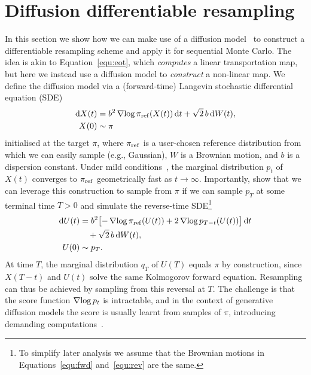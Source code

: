 \documentclass{article}
\begin{document}
\section{Diffusion differentiable resampling}
\label{sec:diffres}
In this section we show how we can make use of a diffusion model~\citep[without training, cf.][]{Baker2025, Wan2025diffpf} to construct a differentiable resampling scheme and apply it for sequential Monte Carlo. 
The idea is akin to Equation~\eqref{equ:eot}, which \emph{computes} a linear transportation map, but here we instead use a diffusion model to \emph{construct} a non-linear map. 
We define the diffusion model via a (forward-time) Langevin stochastic differential equation (SDE)
%
\begin{equation}
    \begin{split}
        \mathop{}\!\mathrm{d} X(t) &= b^2\operatorname{\nabla\!} \log \pi_{\mathrm{ref}}(X(t)) \mathop{}\!\mathrm{d} t + \sqrt{2} \, b \mathop{}\!\mathrm{d} W(t), \\
        X(0) &\sim \pi
    \end{split}
    \label{equ:fwd}
\end{equation}
%
initialised at the target $\pi$, where $\pi_{\mathrm{ref}}$ is a user-chosen reference distribution from which we can easily sample (e.g., Gaussian), $W$ is a Brownian motion, and $b$ is a dispersion constant. 
Under mild conditions~\citep{Meyn2009}, the marginal distribution $p_t$ of $X(t)$ converges to $\pi_{\mathrm{ref}}$ geometrically fast as $t\to\infty$. 
Importantly, \citet{Song2021scorebased, Anderson1982} show that we can leverage this construction to sample from $\pi$ if we can sample $p_T$ at some terminal time $T>0$ and simulate the reverse-time SDE\footnote{To simplify later analysis we assume that the Brownian motions in Equations~\eqref{equ:fwd} and~\eqref{equ:rev} are the same.}
%
\begin{align}
    \mathop{}\!\mathrm{d} U(t) &= b^2 \bigl[-\operatorname{\nabla\!} \log \pi_{\mathrm{ref}}(U(t)) + 2\operatorname{\nabla\!}\log p_{T - t}(U(t)) \bigr]\mathop{}\!\mathrm{d} t \nonumber\\
    &\quad + \sqrt{2} \, b \mathop{}\!\mathrm{d} W(t), \label{equ:rev}\\
    U(0) &\sim p_T.\nonumber
\end{align}
%
At time $T$, the marginal distribution $q_T$ of $U(T)$ equals $\pi$ by construction, since $X(T - t)$ and $U(t)$ solve the same Kolmogorov forward equation. 
Resampling can thus be achieved by sampling from this reversal at $T$. 
The challenge is that the score function $\operatorname{\nabla\!} \log p_t$ is intractable, and in the context of generative diffusion models the score is usually learnt from samples of $\pi$, introducing demanding computations~\citep{Zhao2024rsta}. 
\end{document}
